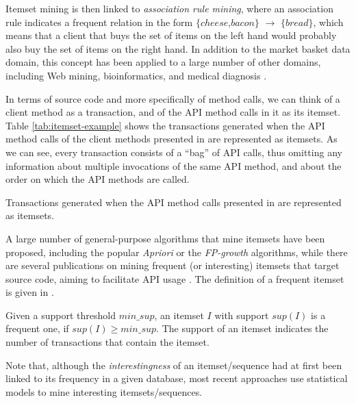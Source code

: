 Itemset mining is then linked to \textit{association rule mining}, where an association rule indicates a frequent relation in the form $\{cheese$,$bacon\}$ $\rightarrow$ $\{bread\}$, which means that a client that buys the set of items on the left hand would probably also buy the set of items on the right hand. In addition to the market basket data domain, this concept has been applied to a large number of other domains, including Web mining, bioinformatics, and medical diagnosis \cite{Tan:2005}. 

In terms of source code and more specifically of method calls, we can think of a client method as a transaction, and of the API method calls in it as its itemset. Table \ref{tab:itemset-example} shows the transactions generated when the API method calls of the client methods presented in  are represented as itemsets. As we can see, every transaction consists of a ``bag'' of API calls, thus omitting any information about multiple invocations of the same API method, and about the order on which the API methods are called.

\begin{table}[ht]
\centering
\small
\caption[Representing the API method calls as an itemset]{Transactions generated when the API method calls presented in  are represented as itemsets.}
\label{tab:itemset-example}

\end{table}

A large number of general-purpose algorithms that mine itemsets have been proposed, including the popular \textit{Apriori} \cite{Agrawal:1994} or the \textit{FP-growth} \cite{Han:2000} algorithms, while there are several publications on mining frequent (or interesting) itemsets that target source code, aiming to facilitate API usage \cite{Li:2005, Livshits:2005}\cite{Fowkes:2015}. The definition of a frequent itemset is given in .

\begin{defn}
\label{def:freq-itemset}
Given a support threshold $min\_sup$, an itemset $I$ with support $sup(I)$ is a frequent one, if $sup(I)\geq min\_sup$. The support of an itemset indicates the number of transactions that contain the itemset.
\end{defn}

Note that, although the \textit{interestingness} of an itemset/sequence had at first been linked to its frequency in a given database, most recent approaches use statistical models to mine interesting itemsets/sequences.


